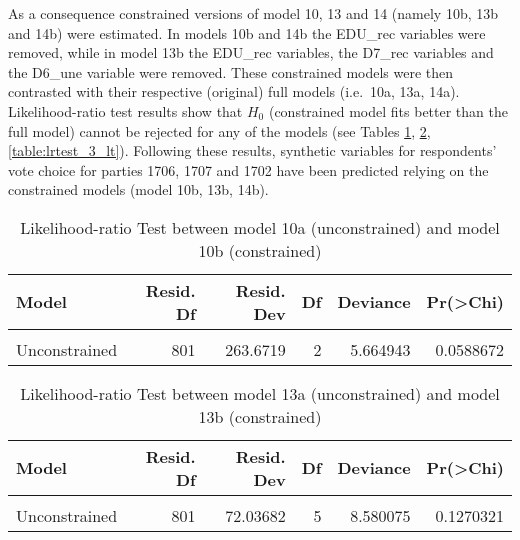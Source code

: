 \documentclass[
]{article}
\begin{document}
As a consequence constrained versions of model 10, 13 and 14 (namely 10b, 13b and 14b) were estimated. In models 10b and 14b the EDU\_rec variables were removed, while in model 13b the EDU\_rec variables, the D7\_rec variables and the D6\_une variable were removed. These constrained models were then contrasted with their respective (original) full models (i.e.~10a, 13a, 14a). Likelihood-ratio test results show that \(H_0\) (constrained model fits better than the full model) cannot be rejected for any of the models (see Tables \ref{table:lrtest_1_lt}, \ref{table:lrtest_2_lt}, \ref{table:lrtest_3_lt}). Following these results, synthetic variables for respondents' vote choice for parties 1706, 1707 and 1702 have been predicted relying on the constrained models (model 10b, 13b, 14b).

\begin{table}[!h]

\caption{\label{tab:unnamed-chunk-110}Likelihood-ratio Test between model 10a (unconstrained) and model 10b (constrained)
                  \label{table:lrtest_1_lt}}
\centering
\begin{tabular}[t]{l|r|r|r|r|r}
\hline
Model & Resid. Df & Resid. Dev & Df & Deviance & Pr(>Chi)\\
\hline
\cellcolor{gray!6}{Constrained} & \cellcolor{gray!6}{803} & \cellcolor{gray!6}{269.3368} & \cellcolor{gray!6}{} & \cellcolor{gray!6}{} & \cellcolor{gray!6}{}\\
\hline
Unconstrained & 801 & 263.6719 & 2 & 5.664943 & 0.0588672\\
\hline
\end{tabular}
\end{table}

\begin{table}[!h]

\caption{\label{tab:unnamed-chunk-111}Likelihood-ratio Test between model 13a (unconstrained) and model 13b (constrained)
                  \label{table:lrtest_2_lt}}
\centering
\begin{tabular}[t]{l|r|r|r|r|r}
\hline
Model & Resid. Df & Resid. Dev & Df & Deviance & Pr(>Chi)\\
\hline
\cellcolor{gray!6}{Constrained} & \cellcolor{gray!6}{806} & \cellcolor{gray!6}{80.61689} & \cellcolor{gray!6}{} & \cellcolor{gray!6}{} & \cellcolor{gray!6}{}\\
\hline
Unconstrained & 801 & 72.03682 & 5 & 8.580075 & 0.1270321\\
\hline
\end{tabular}
\end{table}
\end{document}
